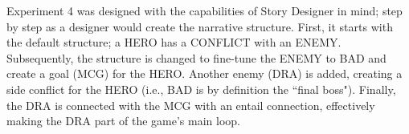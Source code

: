 Experiment 4 was designed with the capabilities of Story Designer in mind; step by step as a designer would create the narrative structure. First, it starts with the default structure; a HERO has a CONFLICT with an ENEMY. Subsequently, the structure is changed to fine-tune the ENEMY to BAD and create a goal (MCG) for the HERO. Another enemy (DRA) is added, creating a side conflict for the HERO (i.e., BAD is by definition the ``final boss"). Finally, the DRA is connected with the MCG with an entail connection, effectively making the DRA part of the game's main loop.






